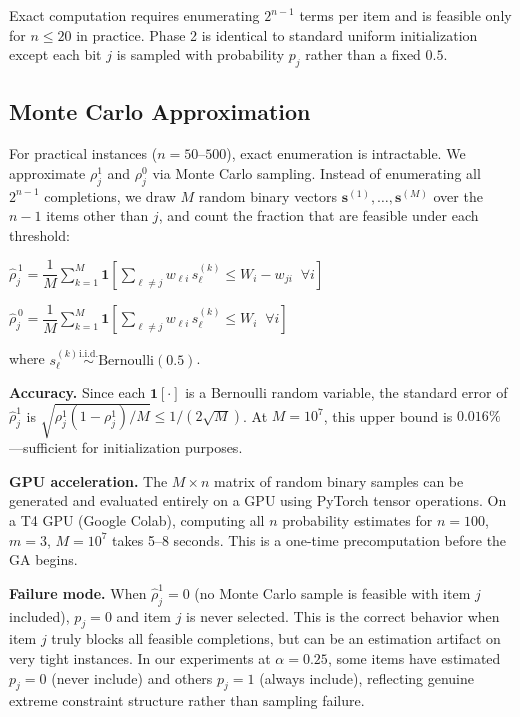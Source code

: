 \documentclass[twocolumn]{article}
\begin{document}
Exact computation requires enumerating $2^{n-1}$ terms per item and is 
feasible only for $n \leq 20$ in practice. Phase 2 is identical to 
standard uniform initialization except each bit $j$ is sampled with 
probability $p_j$ rather than a fixed $0.5$.

\subsection{Monte Carlo Approximation}
\label{sec:montecarlo}

For practical instances ($n = 50$--$500$), exact enumeration is 
intractable. We approximate $\rho_j^1$ and $\rho_j^0$ via Monte Carlo 
sampling. Instead of enumerating all $2^{n-1}$ completions, we draw 
$M$ random binary vectors $\mathbf{s}^{(1)}, \ldots, \mathbf{s}^{(M)}$ 
over the $n-1$ items other than $j$, and count the fraction that are 
feasible under each threshold:

\begin{flushleft}
\hspace{2em}$\hat{\rho}_{j}^{\,1} = \dfrac{1}{M} 
\displaystyle\sum_{k=1}^{M} 
\mathbf{1}\!\left[\displaystyle\sum_{\ell \neq j} w_{\ell i}\, s_\ell^{(k)} 
\leq W_i - w_{ji} \;\; \forall i\right]$
\end{flushleft}

\begin{flushleft}
\hspace{2em}$\hat{\rho}_{j}^{\,0} = \dfrac{1}{M} 
\displaystyle\sum_{k=1}^{M} 
\mathbf{1}\!\left[\displaystyle\sum_{\ell \neq j} w_{\ell i}\, s_\ell^{(k)} 
\leq W_i \;\; \forall i\right]$
\end{flushleft}

\noindent where $s_\ell^{(k)} \overset{\text{i.i.d.}}{\sim} 
\text{Bernoulli}(0.5)$.

\noindent \textbf{Accuracy.} Since each $\mathbf{1}[\cdot]$ is a 
Bernoulli random variable, the standard error of $\hat{\rho}_j^1$ is 
$\sqrt{\rho_j^1(1-\rho_j^1)/M} \leq 1/(2\sqrt{M})$. At 
$M = 10^7$, this upper bound is $0.016\%$---sufficient for 
initialization purposes.

\noindent \textbf{GPU acceleration.} The $M \times n$ matrix of random 
binary samples can be generated and evaluated entirely on a GPU using 
PyTorch tensor operations. On a T4 GPU (Google Colab), computing all 
$n$ probability estimates for $n = 100$, $m = 3$, $M = 10^7$ takes 
5--8 seconds. This is a one-time precomputation before the GA begins.

\noindent \textbf{Failure mode.} When $\hat{\rho}_j^1 = 0$ 
(no Monte Carlo sample is feasible with item $j$ included), 
$p_j = 0$ and item $j$ is never selected. This is the correct behavior 
when item $j$ truly blocks all feasible completions, but can be an 
estimation artifact on very tight instances. In our experiments at 
$\alpha = 0.25$, some items have estimated $p_j = 0$ (never include) 
and others $p_j = 1$ (always include), reflecting genuine extreme 
constraint structure rather than sampling failure.
\end{document}
